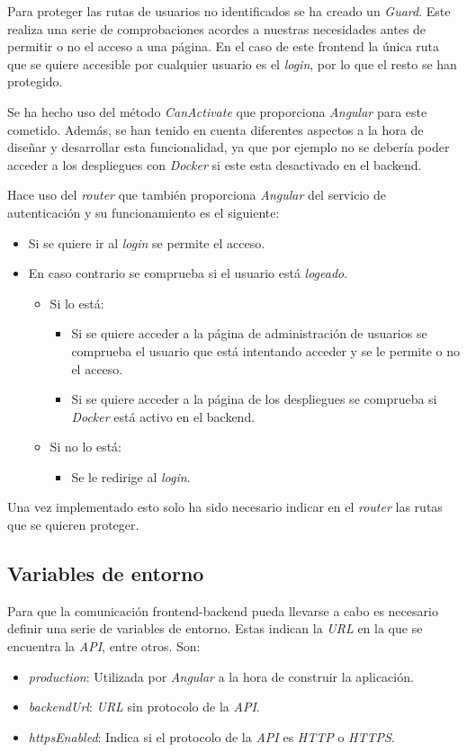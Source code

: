 Para proteger las rutas de usuarios no identificados se ha creado un \textit{Guard}. Este realiza una serie de comprobaciones acordes a nuestras necesidades antes de permitir o no el acceso a una página. En el caso de este frontend la única ruta que se quiere accesible por cualquier usuario es el \textit{login}, por lo que el resto se han protegido.

Se ha hecho uso del método \textit{CanActivate} que proporciona \textit{Angular} para este cometido. Además, se han tenido en cuenta diferentes aspectos a la hora de diseñar y desarrollar esta funcionalidad, ya que por ejemplo no se debería poder acceder a los despliegues con \textit{Docker} si este esta desactivado en el backend.

Hace uso del \textit{router} que también proporciona \textit{Angular} del servicio de autenticación y su funcionamiento es el siguiente:
\begin{itemize}
	\item Si se quiere ir al \textit{login} se permite el acceso.
	\item En caso contrario se comprueba si el usuario está \textit{logeado}.
	\begin{itemize}
		\item Si lo está:
			\begin{itemize}
				\item Si se quiere acceder a la página de administración de usuarios se comprueba el usuario que está intentando acceder y se le permite o no el acceso.
				\item Si se quiere acceder a la página de los despliegues se comprueba si \textit{Docker} está activo en el backend.
			\end{itemize}
		\item Si no lo está:
			\begin{itemize}
				\item Se le redirige al \textit{login}.
			\end{itemize}
	\end{itemize}
\end{itemize}

\bigskip
Una vez implementado esto solo ha sido necesario indicar en el \textit{router} las rutas que se quieren proteger.


\subsection{Variables de entorno}


Para que la comunicación frontend-backend pueda llevarse a cabo es necesario definir una serie de variables de entorno. Estas indican la \textit{URL} en la que se encuentra la \textit{API}, entre otros. Son:
\begin{itemize}
	\item \textit{production}: Utilizada por \textit{Angular} a la hora de construir la aplicación.
	\item \textit{backendUrl}: \textit{URL} sin protocolo de la \textit{API}.
	\item \textit{httpsEnabled}: Indica si el protocolo de la \textit{API} es \textit{HTTP} o \textit{HTTPS}.
\end{itemize}

